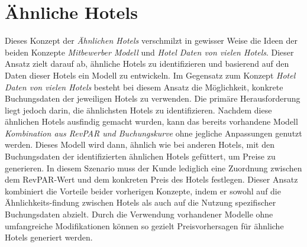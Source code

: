 \section{Ähnliche Hotels}
\label{sec:aehnliche_hotels}
Dieses Konzept der \emph{Ähnlichen Hotels} verschmilzt in gewisser Weise die Ideen der beiden Konzepte \emph{Mitbewerber Modell} und \emph{Hotel Daten von vielen Hotels}. Dieser Ansatz zielt darauf ab, ähnliche Hotels zu identifizieren und basierend auf den Daten dieser Hotels ein Modell zu entwickeln.
\newline
\newline
Im Gegensatz zum Konzept \emph{Hotel Daten von vielen Hotels} besteht bei diesem Ansatz die Möglichkeit, konkrete Buchungsdaten der jeweiligen Hotels zu verwenden. Die primäre Herausforderung liegt jedoch darin, die ähnlichsten Hotels zu identifizieren. Nachdem diese ähnlichen Hotels ausfindig gemacht wurden, kann das bereits vorhandene Modell \emph{Kombination aus RevPAR und Buchungskurve} ohne jegliche Anpassungen genutzt werden.
\newline
\newline
Dieses Modell wird dann, ähnlich wie bei anderen Hotels, mit den Buchungsdaten der identifizierten ähnlichen Hotels gefüttert, um Preise zu generieren. In diesem Szenario muss der Kunde lediglich eine Zuordnung zwischen dem RevPAR-Wert und dem konkreten Preis des Hotels festlegen.
\newline
\newline
Dieser Ansatz kombiniert die Vorteile beider vorherigen Konzepte, indem er sowohl auf die Ähnlichkeits-findung zwischen Hotels als auch auf die Nutzung spezifischer Buchungsdaten abzielt. Durch die Verwendung vorhandener Modelle ohne umfangreiche Modifikationen können so gezielt Preisvorhersagen für ähnliche Hotels generiert werden.